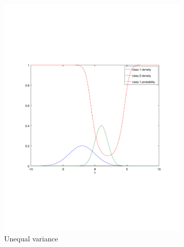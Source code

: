 \begin{frame}
\begin{figure}[H]
\begin{subfigure}{\fwidth}
      \includegraphics[width=\textwidth]{../figures/unequal-variance}
      \caption{Unequal variance}
    \end{subfigure}
    \begin{subfigure}{\fwidth}

\end{subfigure}
\end{figure}
\end{frame}
